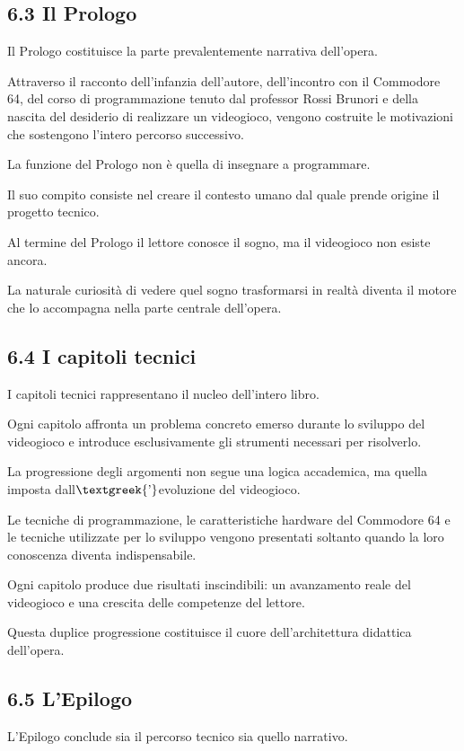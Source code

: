\documentclass{article}
\begin{document}
\subsection{6.3 Il Prologo}
Il Prologo costituisce la parte prevalentemente narrativa dell'opera.

Attraverso il racconto dell'infanzia dell'autore, dell'incontro con il Commodore 64, del corso di programmazione tenuto
dal professor Rossi Brunori e della nascita del desiderio di realizzare un videogioco, vengono costruite le motivazioni
che sostengono l'intero percorso successivo.

La funzione del Prologo non è quella di insegnare a programmare.

Il suo compito consiste nel creare il contesto umano dal quale prende origine il progetto tecnico.

Al termine del Prologo il lettore conosce il sogno, ma il videogioco non esiste ancora.

La naturale curiosità di vedere quel sogno trasformarsi in realtà diventa il motore che lo accompagna nella parte
centrale dell'opera.

\subsection{6.4 I capitoli tecnici}
I capitoli tecnici rappresentano il nucleo dell'intero libro.

Ogni capitolo affronta un problema concreto emerso durante lo sviluppo del videogioco e introduce esclusivamente gli
strumenti necessari per risolverlo.

La progressione degli argomenti non segue una logica accademica, ma quella imposta dall$\text{\textgreek{’}}$evoluzione
del videogioco.

Le tecniche di programmazione, le caratteristiche hardware del Commodore 64 e le tecniche utilizzate per lo sviluppo
vengono presentati soltanto quando la loro conoscenza diventa indispensabile.

Ogni capitolo produce due risultati inscindibili: un avanzamento reale del videogioco e una crescita delle competenze
del lettore.

Questa duplice progressione costituisce il cuore dell'architettura didattica dell'opera.

\subsection[6.5 L{}'Epilogo]{6.5 L'Epilogo}
L'Epilogo conclude sia il percorso tecnico sia quello narrativo.
\end{document}
